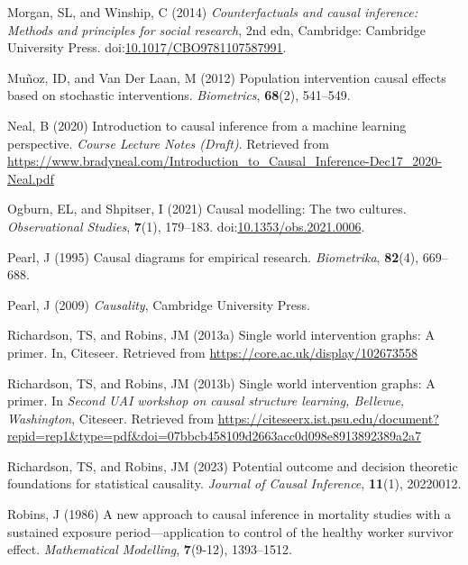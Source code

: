 \documentclass[
  single column]{article}
\newlength{\cslhangindent}
\newenvironment{CSLReferences}[2] %
 {\begin{list}{}{%
  \setlength{\itemindent}{0pt}
  \setlength{\leftmargin}{0pt}
  \setlength{\parsep}{0pt}
  \ifodd #1
   \setlength{\leftmargin}{\cslhangindent}
   \setlength{\itemindent}{-1\cslhangindent}
  \fi
  \setlength{\itemsep}{#2\baselineskip}}}
 {\end{list}}
\begin{document}
\begin{CSLReferences}{1}{0}
Morgan, SL, and Winship, C (2014) \emph{Counterfactuals and causal
inference: Methods and principles for social research}, 2nd edn,
Cambridge: Cambridge University Press.
doi:\href{https://doi.org/10.1017/CBO9781107587991}{10.1017/CBO9781107587991}.

Muñoz, ID, and Van Der Laan, M (2012) Population intervention causal
effects based on stochastic interventions. \emph{Biometrics},
\textbf{68}(2), 541--549.

Neal, B (2020) Introduction to causal inference from a machine learning
perspective. \emph{Course Lecture Notes (Draft)}. Retrieved from
\url{https://www.bradyneal.com/Introduction_to_Causal_Inference-Dec17_2020-Neal.pdf}

Ogburn, EL, and Shpitser, I (2021) Causal modelling: The two cultures.
\emph{Observational Studies}, \textbf{7}(1), 179--183.
doi:\href{https://doi.org/10.1353/obs.2021.0006}{10.1353/obs.2021.0006}.

Pearl, J (1995) Causal diagrams for empirical research.
\emph{Biometrika}, \textbf{82}(4), 669--688.

Pearl, J (2009) \emph{Causality}, Cambridge University Press.

Richardson, TS, and Robins, JM (2013a) Single world intervention graphs:
A primer. In, Citeseer. Retrieved from
\url{https://core.ac.uk/display/102673558}

Richardson, TS, and Robins, JM (2013b) Single world intervention graphs:
A primer. In \emph{Second UAI workshop on causal structure learning,
{B}ellevue, {W}ashington}, Citeseer. Retrieved from
\url{https://citeseerx.ist.psu.edu/document?repid=rep1&type=pdf&doi=07bbcb458109d2663acc0d098e8913892389a2a7}

Richardson, TS, and Robins, JM (2023) Potential outcome and decision
theoretic foundations for statistical causality. \emph{Journal of Causal
Inference}, \textbf{11}(1), 20220012.

Robins, J (1986) A new approach to causal inference in mortality studies
with a sustained exposure period---application to control of the healthy
worker survivor effect. \emph{Mathematical Modelling}, \textbf{7}(9-12),
1393--1512.


\end{CSLReferences}
\end{document}

